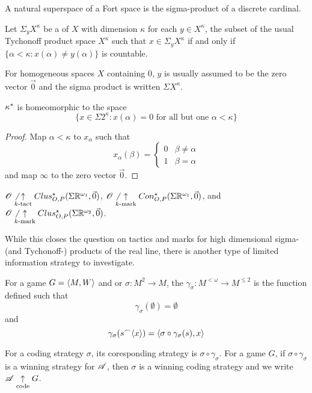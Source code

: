 A natural superspace of a Fort space is the sigma-product of a discrete
cardinal.

\begin{defn}
  Let $\Sigma_{y} X^\kappa$ be a  of $X$ with dimension
  $\kappa$ for each $y\in X^\kappa$, the subset of the usual Tychonoff
  product space $X^\kappa$ such that $x\in \Sigma_y X^\kappa$ if and only if
  $\{\alpha<\kappa : x(\alpha)\not=y(\alpha)\}$ is countable.

  For homogeneous spaces $X$ containing $0$, $y$ is usually assumed to be the
  zero vector $\vec 0$ and the sigma product is written $\Sigma X^\kappa$.
\end{defn}

\begin{prop}
  $\kappa^*$ is homeomorphic to the space
  \[
    \{
    x\in \Sigma 2^\kappa
      :
    x(\alpha)=0 \text{ for all but one } \alpha<\kappa
    \}
  \]
\end{prop}

\begin{proof}
  Map $\alpha<\kappa$ to $x_\alpha$ such that
  \[
    x_\alpha(\beta) =
    \left\{
      \begin{array}{ll}
        0 & \beta\not=\alpha \\
        1 & \beta=\alpha
      \end{array}
    \right.
  \]
  and map $\infty$ to the zero vector $\vec0$.
\end{proof}

\begin{cor}
  $\mathscr{O}\not\underset{k\text{-tact}}{\uparrow}Clus_{O,P}^\star(\Sigma\mathbb{R}^{\omega_1},\vec0)$,
  $\mathscr{O}\not\underset{k\text{-mark}}{\uparrow}Con_{O,P}^\star(\Sigma\mathbb{R}^{\omega_1},\vec0)$, and
  $\mathscr{O}\not\underset{k\text{-mark}}{\uparrow}Clus_{O,P}^\star(\Sigma\mathbb{R}^{\omega_2},\vec0)$.
\end{cor}

While this closes the question on tactics and marks for high dimensional
sigma- (and Tychonoff-) products of the real line, there is another type of
limited information strategy to investigate.

\begin{defn}
  For a game $G=\langle M,W\rangle$ and  or 
  $\sigma:M^2\to M$, the 
  $\gamma_\sigma: M^{<\omega}\to M^{\leq2}$ is the function defined such that
    \[
      \gamma_\sigma(\emptyset) = \emptyset
    \]
  and
    \[
      \gamma_\sigma(s{^\frown}\langle x\rangle) = \langle\sigma\circ\gamma_\sigma(s),x\rangle
    \]

  For a coding strategy $\sigma$, its coresponding strategy is
  $\sigma\circ\gamma_\sigma$. For a game $G$, if $\sigma\circ\gamma_\sigma$
  is a winning strategy for $\mathscr{A}$, then $\sigma$ is a winning coding
  strategy and we write $\mathscr{A} \underset{\text{code}}{\uparrow} G$.
\end{defn}


